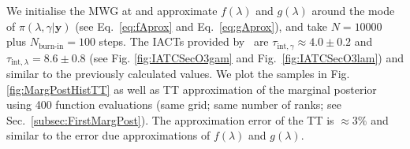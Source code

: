 We initialise the MWG at and approximate $f(\lambda)$ and $g(\lambda)$ around the mode of $\pi(\lambda,\gamma| \bm{y})$ (see Eq.~\ref{eq:fAprox} and Eq.~\ref{eq:gAprox}), and take $N = 10000$ plus $N_{\text{burn-in}} = 100$ steps.
The IACTs provided by~\cite{drikHesse} are $\tau_{\text{int}, \gamma} \approx 4.0 \pm 0.2$ and $\tau_{\text{int}, \lambda} = 8.6 \pm 0.8 $ (see Fig. \ref{fig:IATCSecO3gam} and Fig.~\ref{fig:IATCSecO3lam}) and similar to the previously calculated values.
We plot the samples in Fig. \ref{fig:MargPostHistTT} as well as TT approximation of the marginal posterior using 400 function evaluations (same grid; same number of ranks; see Sec.~\ref{subsec:FirstMargPost}).
The approximation error of the TT is $\approx 3 \%$ and similar to the error due approximations of $f(\lambda)$ and $g(\lambda)$.

